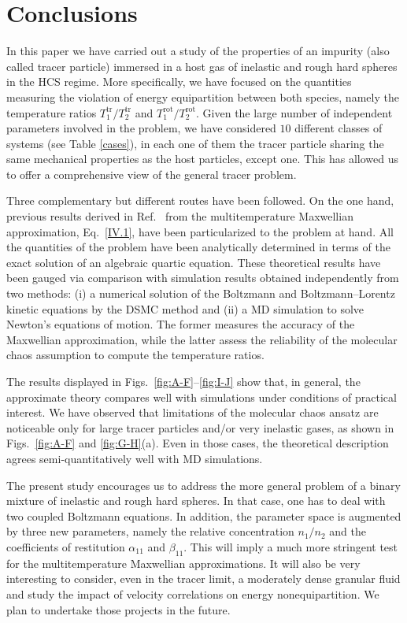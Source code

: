 \documentclass[aps,pre,reprint]{revtex4-1}
\newcommand{\Tt}{T^{\text{tr}}}
\newcommand{\Tr}{T^{\text{rot}}}
\begin{document}
\section{Conclusions}
\label{sec5}
In this paper we have carried out a  study of the properties of an impurity (also
called tracer particle) immersed in a host gas of inelastic and rough hard spheres in the HCS regime. More specifically, we have focused on the quantities measuring the violation of energy equipartition between both species, namely the temperature ratios $\Tt_1/\Tt_2$ and $\Tr_1/\Tr_2$. Given the large number of independent parameters involved in the problem, we have considered $10$ different classes of systems (see Table \ref{cases}), in each one of them the tracer particle sharing the same mechanical properties as the host particles, except one. This has allowed us to offer a comprehensive view of the general tracer problem.

Three complementary but different routes have been followed. On the one hand, previous  results derived in Ref.\ \cite{SKG10} from the multitemperature Maxwellian approximation, Eq.\ \eqref{IV.1}, have been particularized to the problem at hand. All the quantities of the problem have been analytically determined in terms of the exact solution of an algebraic quartic equation. These theoretical results have been gauged via comparison with simulation results obtained independently from two methods: (i) a numerical solution of the Boltzmann and Boltzmann--Lorentz kinetic equations by the DSMC method and (ii) a MD simulation to solve Newton's equations of motion. The former  measures the accuracy of the Maxwellian approximation, while the latter assess the reliability of the molecular chaos assumption to compute the temperature ratios.

The results displayed in Figs.\ \ref{fig:A-F}--\ref{fig:I-J} show that, in general, the approximate theory compares well with simulations under conditions of practical interest. We have observed that limitations of the molecular chaos ansatz are noticeable only for large tracer particles and/or very inelastic gases, as shown in Figs.\ \ref{fig:A-F} and \ref{fig:G-H}(a). Even in those cases, the theoretical description agrees semi-quantitatively well with MD simulations.

The present study encourages us to address the more general problem of a binary mixture of inelastic and rough hard spheres. In that case, one has to deal with two coupled Boltzmann equations. In addition, the parameter space is augmented by three new parameters, namely the relative concentration  $n_1/n_2$ and the coefficients of restitution $\alpha_{11}$ and $\beta_{11}$. This will imply a much more stringent test for the multitemperature Maxwellian approximations. It will also be very interesting to consider, even in the tracer limit,  a moderately dense granular fluid and study the impact of velocity correlations on energy nonequipartition.
We plan to undertake those projects in the future.
\end{document}
